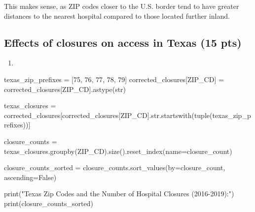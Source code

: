 \documentclass[
  letterpaper,
  DIV=11,
  numbers=noendperiod]{scrartcl}
\newenvironment{Shaded}{\begin{snugshade}}{\end{snugshade}}
\newcommand{\BuiltInTok}[1]{\textcolor[rgb]{0.00,0.23,0.31}{#1}}
\newcommand{\NormalTok}[1]{\textcolor[rgb]{0.00,0.23,0.31}{#1}}
\newcommand{\OperatorTok}[1]{\textcolor[rgb]{0.37,0.37,0.37}{#1}}
\newcommand{\StringTok}[1]{\textcolor[rgb]{0.13,0.47,0.30}{#1}}
\newcommand{\VariableTok}[1]{\textcolor[rgb]{0.07,0.07,0.07}{#1}}
\providecommand{\tightlist}{%
  \setlength{\itemsep}{0pt}\setlength{\parskip}{0pt}}\usepackage{longtable,booktabs,array}
\begin{document}
This makes sense, as ZIP codes closer to the U.S. border tend to have
greater distances to the nearest hospital compared to those located
further inland.

\subsection{Effects of closures on access in Texas (15
pts)}\label{effects-of-closures-on-access-in-texas-15-pts}

\begin{enumerate}
\def\labelenumi{\arabic{enumi}.}
\tightlist
\item
\end{enumerate}

\begin{Shaded}
\begin{Highlighting}[]
\NormalTok{texas\_zip\_prefixes }\OperatorTok{=}\NormalTok{ [}\StringTok{\textquotesingle{}75\textquotesingle{}}\NormalTok{, }\StringTok{\textquotesingle{}76\textquotesingle{}}\NormalTok{, }\StringTok{\textquotesingle{}77\textquotesingle{}}\NormalTok{, }\StringTok{\textquotesingle{}78\textquotesingle{}}\NormalTok{, }\StringTok{\textquotesingle{}79\textquotesingle{}}\NormalTok{]}
\NormalTok{corrected\_closures[}\StringTok{\textquotesingle{}ZIP\_CD\textquotesingle{}}\NormalTok{] }\OperatorTok{=}\NormalTok{ corrected\_closures[}\StringTok{\textquotesingle{}ZIP\_CD\textquotesingle{}}\NormalTok{].astype(}\BuiltInTok{str}\NormalTok{)}

\NormalTok{texas\_closures }\OperatorTok{=}\NormalTok{ corrected\_closures[corrected\_closures[}\StringTok{\textquotesingle{}ZIP\_CD\textquotesingle{}}\NormalTok{].}\BuiltInTok{str}\NormalTok{.startswith(}\BuiltInTok{tuple}\NormalTok{(texas\_zip\_prefixes))]}

\NormalTok{closure\_counts }\OperatorTok{=}\NormalTok{ texas\_closures.groupby(}\StringTok{\textquotesingle{}ZIP\_CD\textquotesingle{}}\NormalTok{).size().reset\_index(name}\OperatorTok{=}\StringTok{\textquotesingle{}closure\_count\textquotesingle{}}\NormalTok{)}

\NormalTok{closure\_counts\_sorted }\OperatorTok{=}\NormalTok{ closure\_counts.sort\_values(by}\OperatorTok{=}\StringTok{\textquotesingle{}closure\_count\textquotesingle{}}\NormalTok{, ascending}\OperatorTok{=}\VariableTok{False}\NormalTok{)}

\BuiltInTok{print}\NormalTok{(}\StringTok{"Texas Zip Codes and the Number of Hospital Closures (2016{-}2019):"}\NormalTok{)}
\BuiltInTok{print}\NormalTok{(closure\_counts\_sorted)}
\end{Highlighting}
\end{Shaded}
\end{document}
